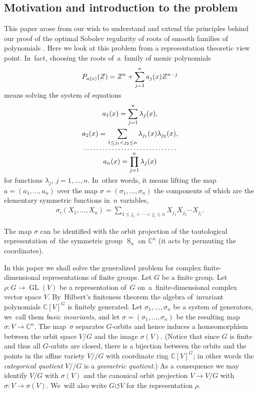 \documentclass[pdftex]{sigma}
\numberwithin{equation}{section}
\def\la{\lambda}
\def\rh{\rho}
\def\si{\sigma}
\def\C{\mathbb{C}}
\def\cq{{/\!\!/}}
\def\acts{\circlearrowleft}
\let\on=\operatorname
\begin{document}
\subsection{Motivation and introduction to the problem}

This paper arose from our wish to understand and extend the principles behind our proof of the optimal Sobolev regularity of roots of smooth families of polynomials \cite{ParusinskiRainerHyp,ParusinskiRainerAC,ParusinskiRainer15,Parusinski:2020aa}. Here we look at this problem from a representation theoretic view point. In~fact, choosing the roots of~a~family of monic polynomials\vspace{-.5ex}
\begin{gather*}
 P_{a(x)}(Z) = Z^n + \sum_{j=1}^n a_j(x) Z^{n-j}\vspace{-1ex}
\end{gather*}
means solving the system of equations
 \begin{gather*}
 a_1(x) = \sum_{j=1}^n \la_j(x), \\
 a_2(x) = \sum_{1 \le j_1 <j_2 \le n} \la_{j_1}(x) \la_{j_2}(x),\\[-1ex]
\cdots\cdots\cdots\cdots\cdots\cdots\cdots\cdots\cdots\cdots \\[-1.5ex]
 a_n(x) = \prod_{j=1}^n \la_j(x)\vspace{-1ex}
 \end{gather*}
for functions $\la_j$, $ j = 1,\dots,n$. In~other words, it means lifting the map $a = (a_1,\dots,a_n)$ over the map
$\si=(\si_1,\dots,\si_n)$ the components of which are the elementary symmetric functions in~$n$ variables,
\begin{gather*}
 \si_i(X_1,\dots,X_n) = \sum_{1 \le j_1 < \cdots < j_i \le n} X_{j_1} X_{j_2} \cdots X_{j_i}.
\end{gather*}

The map $\sigma$ can be identified with the orbit projection of the tautological representation of~the symmetric group $\on{S}_n$
on $\C^n$ (it acts by permuting the coordinates).

In this paper we shall solve the generalized problem for complex finite-dimensional representations of finite groups.
Let $G$ be a finite group.
Let $\rh\colon G \to \on{GL}(V)$ be a representation of~$G$ on~a~finite-dimensional complex vector space $V$. By~Hilbert's finiteness theorem the algebra of~inva\-riant polynomials $\C[V]^G$ is finitely generated.
Let $\si_1,\dots,\si_n$ be a system of generators, we~call them \emph{basic invariants}, and let
$\si= (\si_1,\dots,\si_n)$ be the resulting map $\si \colon V \to \C^n$.
The map~$\si$ separates $G$-orbits and hence induces a homeomorphism between the orbit space $V/G$ and the image $\si(V)$.
(Notice that since $G$ is finite and thus all $G$-orbits are closed, there is a bijection between the orbits and
the points in the affine variety $V \cq G$ with coordinate ring $\C[V]^G$; in other words the \emph{categorical quotient}
$V \cq G$ is a \emph{geometric quotient}.)
As a consequence we may identify $V/G$ with $\si(V)$ and the canonical orbit projection $V \to V/G$ with $\si \colon V \to \si(V)$. We~will also write $G \acts V$ for the representation $\rh$.
\end{document}
